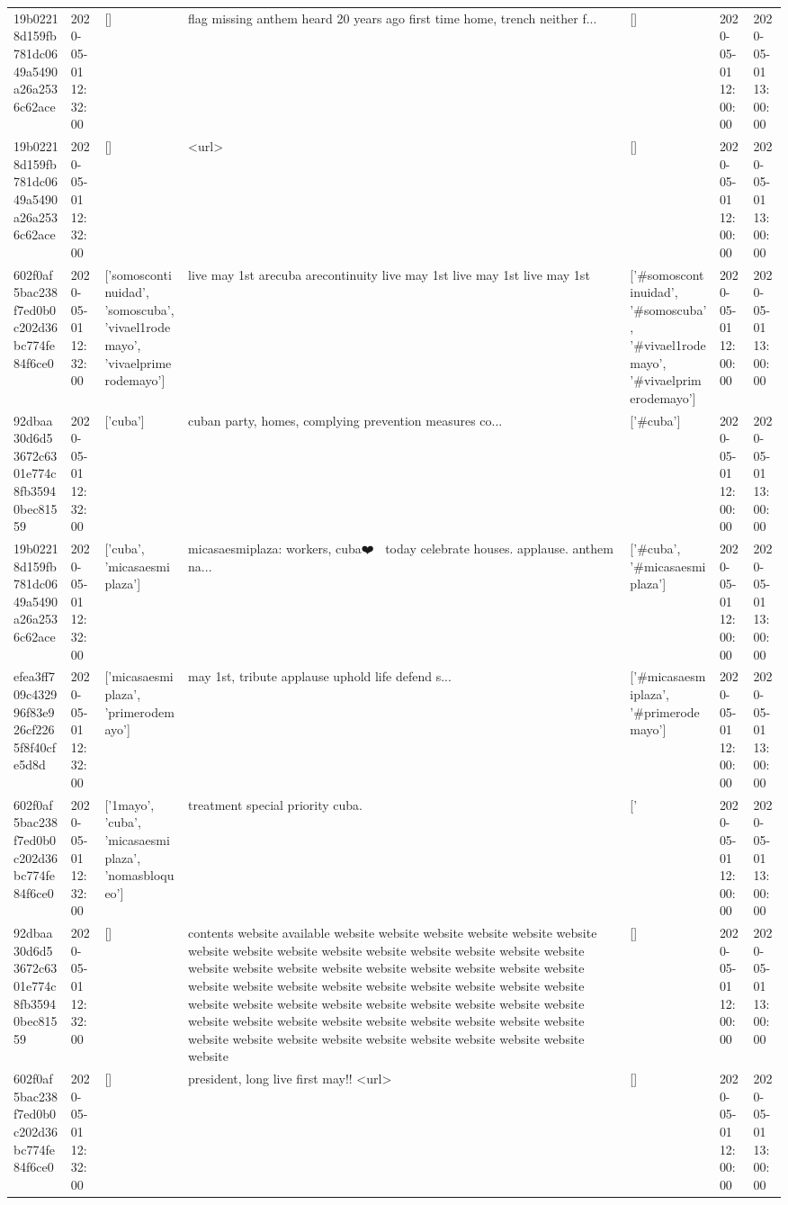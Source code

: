 \begin{tabular}{lllllll}
19b02218d159fb781dc0649a5490a26a2536c62ace & 2020-05-01 12:32:00 & [] & flag missing anthem heard 20 years ago first time home, trench neither f... & [] & 2020-05-01 12:00:00 & 2020-05-01 13:00:00 \\
19b02218d159fb781dc0649a5490a26a2536c62ace & 2020-05-01 12:32:00 & [] & <url> & [] & 2020-05-01 12:00:00 & 2020-05-01 13:00:00 \\
602f0af5bac238f7ed0b0c202d36bc774fe84f6ce0 & 2020-05-01 12:32:00 & ['somoscontinuidad', 'somoscuba', 'vivael1rodemayo', 'vivaelprimerodemayo'] & live may 1st arecuba arecontinuity live may 1st live may 1st live may 1st & ['#somoscontinuidad', '#somoscuba', '#vivael1rodemayo', '#vivaelprimerodemayo'] & 2020-05-01 12:00:00 & 2020-05-01 13:00:00 \\
92dbaa30d6d53672c6301e774c8fb35940bec81559 & 2020-05-01 12:32:00 & ['cuba'] & cuban party, homes, complying prevention measures co... & ['#cuba'] & 2020-05-01 12:00:00 & 2020-05-01 13:00:00 \\
19b02218d159fb781dc0649a5490a26a2536c62ace & 2020-05-01 12:32:00 & ['cuba', 'micasaesmiplaza'] & micasaesmiplaza: workers, cuba❤️👏👏 today celebrate houses. applause. anthem na... & ['#cuba', '#micasaesmiplaza'] & 2020-05-01 12:00:00 & 2020-05-01 13:00:00 \\
efea3ff709c432996f83e926cf2265f8f40cfe5d8d & 2020-05-01 12:32:00 & ['micasaesmiplaza', 'primerodemayo'] & may 1st, tribute applause uphold life defend s... & ['#micasaesmiplaza', '#primerodemayo'] & 2020-05-01 12:00:00 & 2020-05-01 13:00:00 \\
602f0af5bac238f7ed0b0c202d36bc774fe84f6ce0 & 2020-05-01 12:32:00 & ['1mayo', 'cuba', 'micasaesmiplaza', 'nomasbloqueo'] & treatment special priority cuba. & ['#1mayo', '#cuba', '#micasaesmiplaza', '#nomasbloqueo'] & 2020-05-01 12:00:00 & 2020-05-01 13:00:00 \\
92dbaa30d6d53672c6301e774c8fb35940bec81559 & 2020-05-01 12:32:00 & [] & contents website available website website website website website website website website website website website website website website website website website website website website website website website website website website website website website website website website website website website website website website website website website website website website website website website website website website website website website website website website website website website website website & [] & 2020-05-01 12:00:00 & 2020-05-01 13:00:00 \\
602f0af5bac238f7ed0b0c202d36bc774fe84f6ce0 & 2020-05-01 12:32:00 & [] & president, long live first may!! <url> & [] & 2020-05-01 12:00:00 & 2020-05-01 13:00:00 \\

\end{tabular}
